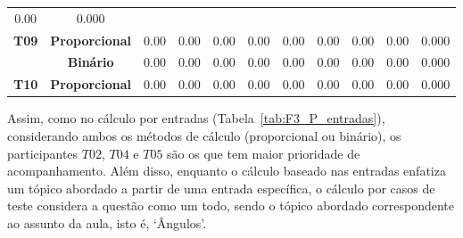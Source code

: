 \begin{table}[htbp]
\begin{tabular}{|c|cccccccccc|}
		\multicolumn{1}{c|}{0.00} &
		0.000 \\ \cline{2-11} 
		\multirow{-2}{*}{\textbf{T09}} &
		\multicolumn{1}{c|}{\cellcolor[HTML]{F2F2F2}\textbf{Proporcional}} &
		\multicolumn{1}{c|}{\cellcolor[HTML]{F2F2F2}0.00} &
		\multicolumn{1}{c|}{\cellcolor[HTML]{F2F2F2}0.00} &
		\multicolumn{1}{c|}{\cellcolor[HTML]{F2F2F2}0.00} &
		\multicolumn{1}{c|}{\cellcolor[HTML]{F2F2F2}0.00} &
		\multicolumn{1}{c|}{\cellcolor[HTML]{F2F2F2}0.00} &
		\multicolumn{1}{c|}{\cellcolor[HTML]{F2F2F2}0.00} &
		\multicolumn{1}{c|}{\cellcolor[HTML]{F2F2F2}0.00} &
		\multicolumn{1}{c|}{\cellcolor[HTML]{F2F2F2}0.00} &
		\cellcolor[HTML]{F2F2F2}0.000 \\ \hline
		&
		\multicolumn{1}{c|}{\textbf{Binário}} &
		\multicolumn{1}{c|}{0.00} &
		\multicolumn{1}{c|}{0.00} &
		\multicolumn{1}{c|}{0.00} &
		\multicolumn{1}{c|}{0.00} &
		\multicolumn{1}{c|}{0.00} &
		\multicolumn{1}{c|}{0.00} &
		\multicolumn{1}{c|}{0.00} &
		\multicolumn{1}{c|}{0.00} &
		0.000 \\ \cline{2-11} 
		\multirow{-2}{*}{\textbf{T10}} &
		\multicolumn{1}{c|}{\cellcolor[HTML]{F2F2F2}\textbf{Proporcional}} &
		\multicolumn{1}{c|}{\cellcolor[HTML]{F2F2F2}0.00} &
		\multicolumn{1}{c|}{\cellcolor[HTML]{F2F2F2}0.00} &
		\multicolumn{1}{c|}{\cellcolor[HTML]{F2F2F2}0.00} &
		\multicolumn{1}{c|}{\cellcolor[HTML]{F2F2F2}0.00} &
		\multicolumn{1}{c|}{\cellcolor[HTML]{F2F2F2}0.00} &
		\multicolumn{1}{c|}{\cellcolor[HTML]{F2F2F2}0.00} &
		\multicolumn{1}{c|}{\cellcolor[HTML]{F2F2F2}0.00} &
		\multicolumn{1}{c|}{\cellcolor[HTML]{F2F2F2}0.00} &
		\cellcolor[HTML]{F2F2F2}0.000 \\ \hline
	\end{tabular}
	\label{tab:F3_P_casos_semagrupamento}
\end{table}

Assim, como no cálculo por entradas (Tabela~\ref{tab:F3_P_entradas}), considerando ambos os métodos de cálculo (proporcional ou binário), os participantes $T02$, $T04$ e $T05$ são os que tem maior prioridade de acompanhamento. Além disso, enquanto o cálculo baseado nas entradas enfatiza um tópico abordado a partir de uma entrada específica, o cálculo por casos de teste considera a questão como um todo, sendo o tópico abordado correspondente ao assunto da aula, isto é, `Ângulos'. 

